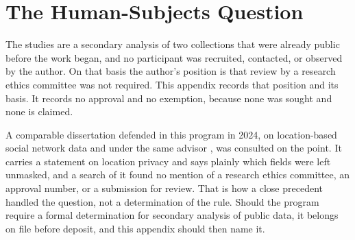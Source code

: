 
\chapter{The Human-Subjects Question}
\label{apx:human-subjects}

The studies are a secondary analysis of two collections that were already public before
the work began, and no participant was recruited, contacted, or observed by the author.
On that basis the author's position is that review by a research ethics committee was
not required. This appendix records that position and its basis. It records no approval
and no exemption, because none was sought and none is claimed.

A comparable dissertation defended in this program in 2024, on location-based social
network data and under the same advisor \cite{santos2024urban}, was consulted on the point. It carries a
statement on location privacy and says plainly which fields were left unmasked, and a
search of it found no mention of a research ethics committee, an approval number, or a
submission for review. That is how a close precedent handled the question, not a
determination of the rule. Should the program require a formal determination for
secondary analysis of public data, it belongs on file before deposit, and this appendix
should then name it.
